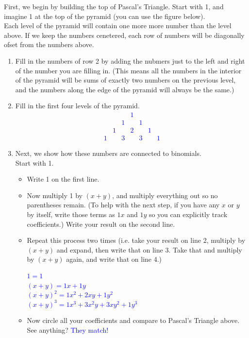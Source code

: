 \documentclass{ximera}
\begin{document}
\begin{exercise}
    First, we begin by building the top of Pascal's Triangle.  Start with 1, and imagine 1 at the top of the pyramid (you can use the figure below).\\
    Each level of the pyramid will contain one more more number than the level above.  If we keep the numbers cenetered, each row of numbers will be diagonally ofset from the numbers above.
    \begin{enumerate}
        \item Fill in the numbers of row 2 by adding the nubmers just to the left and right of the number you are filling in. (This means all the numbers in the interior of the pyramid will be sums of exactly two numbers on the previous level, and the numbers along the edge of the pyramid will always be the same.)
        \item Fill in the first four levels of the pyramid.
        \textcolor{blue}{
        \begin{align}
               & & & 1 & & & \\
               & & 1 & & 1 & &\\
               & 1 & & 2 & & 1 & \\
               1 & & 3 & & 3 & & 1
        \end{align}}
        \item Next, we show how these numbers are connected to binomials.\\
        Start with 1.\\
        \begin{itemize}
            \item Write 1 on the first line.
            \item Now multiply 1 by $(x+y)$, and multiply everything out so no parentheses remain.  (To help with the next step, if you have any $x$ or $y$ by itself, write those terms as $1x$ and $1y$ so you can explicitly track coefficients.)  Write your result on the second line.
            \item Repeat this process two times (i.e. take your result on line 2, multiply by $(x+y)$ and expand, then write that on line 3.  Take that and multiply by $(x+y)$ again, and write that on line 4.)\\
            \textcolor{blue}{
            \begin{center}
                $1=1$\\
                $(x+y)=1x+1y$\\
                $(x+y)^2=1x^2+2xy+1y^2$\\
                $(x+y)^3=1x^3+3x^2y+3xy^2+1y^3$
            \end{center}}
            \item Now circle all your coefficients and compare to Pascal's Triangle above.  See anything? 
            \textcolor{blue}{They match!}
        \end{itemize}
    \end{enumerate}
\end{exercise}
\end{document}
